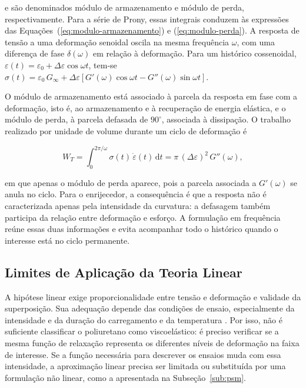 \documentclass[arial,centeredequations,english,brazilian,oneside,section=TITLE]{ifes8}
\begin{document}
e são denominados módulo de armazenamento e módulo de perda, respectivamente. Para a série
de Prony, essas integrais conduzem às expressões das Equações~(\ref{eq:modulo-armazenamento})
e (\ref{eq:modulo-perda}). A resposta de tensão a uma deformação senoidal oscila na mesma
frequência $\omega$, com uma diferença de fase $\delta(\omega)$ em relação à deformação.
Para um histórico cossenoidal,
$\varepsilon(t) = \varepsilon_0 + \Delta\varepsilon\cos\omega t$, tem-se
$\sigma(t) = \varepsilon_0\,G_{\infty} + \Delta\varepsilon\left[G'(\omega)\cos\omega t
- G''(\omega)\sin\omega t\right]$.

O módulo de armazenamento está associado à parcela da resposta em fase com a deformação,
isto é, ao armazenamento e à recuperação de energia elástica, e o módulo de perda, à
parcela defasada de $90^{\circ}$, associada à dissipação. O trabalho realizado por unidade
de volume durante um ciclo de deformação é

\begin{equation}
  \label{eq:ve-trabalho-ciclo}
  W_T = \int_0^{2\pi/\omega} \sigma(t)\,\dot{\varepsilon}(t)\,\mathrm{d}t
  = \pi\,(\Delta\varepsilon)^2\,G''(\omega),
\end{equation}

em que apenas o módulo de perda aparece, pois a parcela associada a $G'(\omega)$ se anula
no ciclo. Para o enrijecedor, a consequência é que a resposta
não é caracterizada apenas pela intensidade da curvatura: a defasagem também
participa da relação entre deformação e esforço. A formulação em frequência
reúne essas duas informações e evita acompanhar todo o histórico quando
o interesse está no ciclo permanente.

\subsection{Limites de Aplicação da Teoria Linear}
\label{sub:limites-linear}

A hipótese linear exige proporcionalidade entre tensão e deformação e validade
da superposição. Sua adequação depende das condições de ensaio, especialmente
da intensidade e da duração do carregamento e da temperatura
\cite{Pagliosa2004,Caire2011}. Por isso, não é suficiente classificar o
poliuretano como viscoelástico: é preciso verificar se a mesma função de
relaxação representa os diferentes níveis de deformação na faixa de interesse.
Se a função necessária para descrever os ensaios muda com essa intensidade,
a aproximação linear precisa ser limitada ou substituída por uma formulação
não linear, como a apresentada na Subseção~\ref{sub:psm}.
\end{document}
